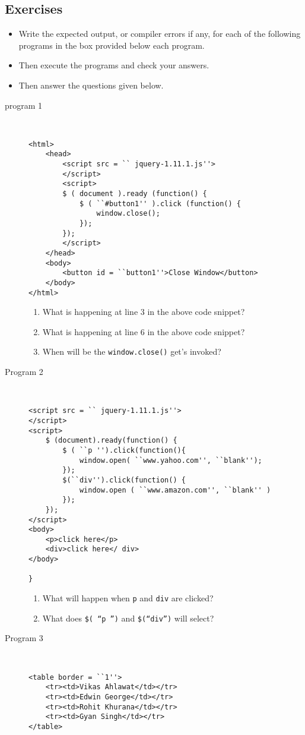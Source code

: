 \documentclass[11pt,a4paper]{article}
\def\AnswerBox{\fbox{\begin{minipage}{4in}\hfill\vspace{0.5in}\end{minipage}}}
\begin{document}
\subsection*{Exercises}
\begin{itemize}
\item Write the expected output, or compiler errors if any, for each of the following programs in the box provided below each program.
\item Then execute the programs and check your answers.
\item Then answer the questions given below.
\end{itemize}
\begin{description}
\item[program 1]\
\begin{lstlisting}
<html>
    <head>
        <script src = `` jquery-1.11.1.js''>
        </script>
        <script>
        $ ( document ).ready (function() {
            $ ( ``#button1'' ).click (function() {
                window.close();
            });
        });
        </script>
    </head>
    <body>
        <button id = ``button1''>Close Window</button>
    </body>
</html>
\end{lstlisting}

\AnswerBox

\begin{enumerate}[label=\bfseries Q\arabic*:]\itemsep10pt
\item What is happening at line 3 in the above code snippet?
\item What is happening at line 6 in the above code snippet?
\item When will be the \texttt{window.close()} get's invoked?
\end{enumerate}

\item[Program 2]\
\begin{lstlisting}
<script src = `` jquery-1.11.1.js''>
</script>
<script>
    $ (document).ready(function() {
        $ ( ``p '').click(function(){
            window.open( ``www.yahoo.com'', ``blank'');
        });
        $(``div'').click(function() {
            window.open ( ``www.amazon.com'', ``blank'' )
        });
    });
</script>
<body>
    <p>click here</p>
    <div>click here</ div>
</body>

}\end{lstlisting}

\AnswerBox

\begin{enumerate}[label=\bfseries Q\arabic*:]\itemsep10pt
\item What will happen when \texttt{p} and \texttt{div} are clicked?
\item What does \texttt{\$( ``p '')} and \texttt{\$(``div'')} will select?
\end{enumerate}
\item [Program 3]\ 
\begin{lstlisting}
<table border = ``1''>
    <tr><td>Vikas Ahlawat</td></tr>
    <tr><td>Edwin George</td></tr>
    <tr><td>Rohit Khurana</td></tr>
    <tr><td>Gyan Singh</td></tr>
</table>


\end{lstlisting}
\end{description}
\end{document}
